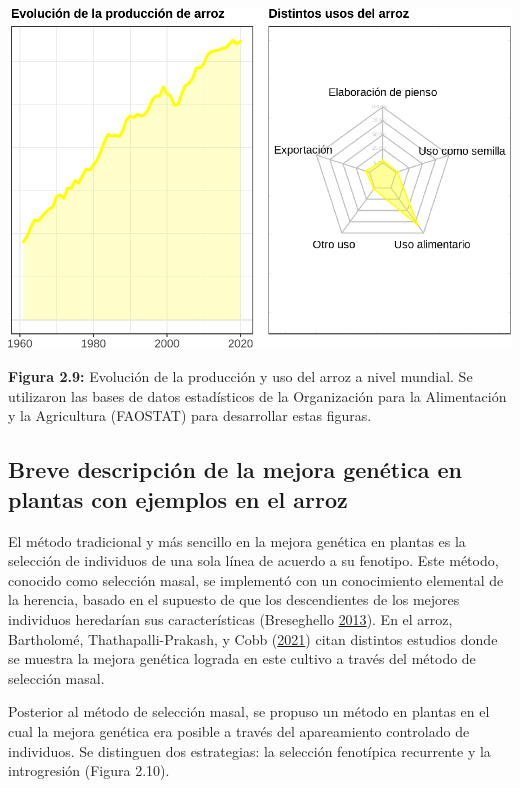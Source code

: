 \documentclass[11pt,spanish,a4paper,oneside,]{book} %
\begin{document}
\begin{center}\includegraphics[width=1\linewidth]{figures/Graf_arroz} \end{center}

\noindent 
\textbf{Figura 2.9:} Evolución de la producción y uso del arroz a nivel mundial. Se utilizaron las bases de datos estadísticos de la Organización para la Alimentación y la Agricultura (FAOSTAT) para desarrollar estas figuras.

\hypertarget{breve-descripciuxf3n-de-la-mejora-genuxe9tica-en-plantas-con-ejemplos-en-el-arroz}{%
\subsection{Breve descripción de la mejora genética en plantas con ejemplos en el arroz}\label{breve-descripciuxf3n-de-la-mejora-genuxe9tica-en-plantas-con-ejemplos-en-el-arroz}}

El método tradicional y más sencillo en la mejora genética en plantas es la selección de individuos de una sola línea de acuerdo a su fenotipo. Este método, conocido como selección masal, se implementó con un conocimiento elemental de la herencia, basado en el supuesto de que los descendientes de los mejores individuos heredarían sus características (Breseghello \protect\hyperlink{ref-cite:57}{2013}). En el arroz, Bartholomé, Thathapalli-Prakash, y Cobb (\protect\hyperlink{ref-cite:58}{2021}) citan distintos estudios donde se muestra la mejora genética lograda en este cultivo a través del método de selección masal.

Posterior al método de selección masal, se propuso un método en plantas en el cual la mejora genética era posible a través del apareamiento controlado de individuos. Se distinguen dos estrategias: la selección fenotípica recurrente y la introgresión (Figura 2.10).
\end{document}
